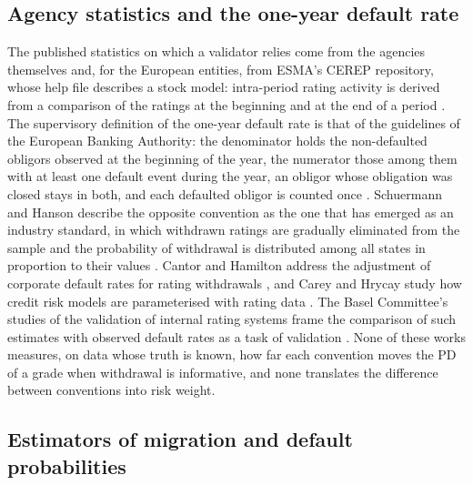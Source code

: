 \subsection{Agency statistics and the one-year default rate}
\label{sec:rw-agency}

The published statistics on which a validator relies come from the agencies themselves and, for the European entities, from ESMA's CEREP repository, whose help file describes a stock model: intra-period rating activity is derived from a comparison of the ratings at the beginning and at the end of a period \citep{ESMA_CEREP}. The supervisory definition of the one-year default rate is that of the guidelines of the European Banking Authority: the denominator holds the non-defaulted obligors observed at the beginning of the year, the numerator those among them with at least one default event during the year, an obligor whose obligation was closed stays in both, and each defaulted obligor is counted once \citep{EBA_2017}. Schuermann and Hanson describe the opposite convention as the one that has emerged as an industry standard, in which withdrawn ratings are gradually eliminated from the sample and the probability of withdrawal is distributed among all states in proportion to their values \citep{Schuermann_2004}. Cantor and Hamilton address the adjustment of corporate default rates for rating withdrawals \citep{Cantor_2007}, and Carey and Hrycay study how credit risk models are parameterised with rating data \citep{Carey_2000}. The Basel Committee's studies of the validation of internal rating systems frame the comparison of such estimates with observed default rates as a task of validation \citep{BCBS_2005}. None of these works measures, on data whose truth is known, how far each convention moves the PD of a grade when withdrawal is informative, and none translates the difference between conventions into risk weight. %

\subsection{Estimators of migration and default probabilities}
\label{sec:rw-estimators}

